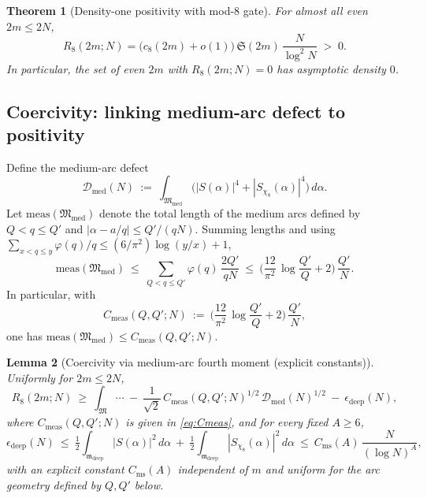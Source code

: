 \documentclass[11pt]{article}
\newtheorem{theorem}{Theorem}
\newtheorem{lemma}[theorem]{Lemma}
\theoremstyle{definition}
\theoremstyle{remark}
\begin{document}
\begin{theorem}[Density-one positivity with mod-8 gate]\label{thm:density-one}
For almost all even $2m\le 2N$,
\[
R_8(2m;N)=\big(c_8(2m){+}o(1)\big)\,\mathfrak S(2m)\,\frac{N}{\log^2 N}\;>\;0.
\]
In particular, the set of even $2m$ with $R_8(2m;N)=0$ has asymptotic density $0$.
\end{theorem}

\subsection*{Coercivity: linking medium-arc defect to positivity}
Define the medium-arc defect
\[
\mathcal D_{\mathrm{med}}(N)\ :=\ \int_{\mathfrak M_{\mathrm{med}}}\Big(|S(\alpha)|^4+|S_{\chi_8}(\alpha)|^4\Big)\,d\alpha.
\]
Let $\mathrm{meas}(\mathfrak M_{\mathrm{med}})$ denote the total length of the medium arcs defined by $Q<q\le Q'$ and $|\alpha-a/q|\le Q'/(qN)$. Summing lengths and using $\sum_{x<q\le y}\!\varphi(q)/q\le (6/\pi^2)\log(y/x)+1$,
\begin{equation}\label{eq:Cmeas}
\mathrm{meas}(\mathfrak M_{\mathrm{med}})\ \le\ \sum_{Q<q\le Q'} \varphi(q)\,\frac{2Q'}{qN}\ \le\ \Big(\frac{12}{\pi^2}\,\log\!\frac{Q'}{Q}+2\Big)\,\frac{Q'}{N}.
\end{equation}
In particular, with
\[
C_{\mathrm{meas}}(Q,Q';N)\ :=\ \Big(\frac{12}{\pi^2}\,\log\!\frac{Q'}{Q}+2\Big)\,\frac{Q'}{N},
\]
one has $\mathrm{meas}(\mathfrak M_{\mathrm{med}})\le C_{\mathrm{meas}}(Q,Q';N)$.

\begin{lemma}[Coercivity via medium-arc fourth moment (explicit constants)]
Uniformly for $2m\le 2N$,
\[
R_8(2m;N)\ \ge\ \int_{\mathfrak M}\cdots\ -\ \frac{1}{\sqrt{2}}\,C_{\mathrm{meas}}(Q,Q';N)^{1/2}\,\mathcal D_{\mathrm{med}}(N)^{1/2}\ -\ \epsilon_{\mathrm{deep}}(N),
\]
where $C_{\mathrm{meas}}(Q,Q';N)$ is given in \eqref{eq:Cmeas}, and for every fixed $A\ge 6$,
\begin{equation}\label{eq:deep-L2}
\epsilon_{\mathrm{deep}}(N)\ \le\ \tfrac12\int_{\mathfrak m_{\mathrm{deep}}}\!|S(\alpha)|^2\,d\alpha\ +\ \tfrac12\int_{\mathfrak m_{\mathrm{deep}}}\!|S_{\chi_8}(\alpha)|^2\,d\alpha\ \le\ C_{\mathrm{ms}}(A)\,\frac{N}{(\log N)^A},
\end{equation}
with an explicit constant $C_{\mathrm{ms}}(A)$ independent of $m$ and uniform for the arc geometry defined by $Q,Q'$ below.
\end{lemma}
\end{document}
